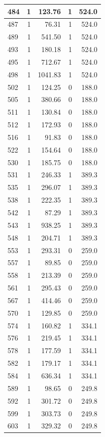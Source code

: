 \documentclass[
  12pt,
]{book}
\begin{document}
\begin{tabular}{l|r|r|r|r}
\hline
484 & 1 & 123.76 & 1 & 524.0\\
\hline
487 & 1 & 76.31 & 1 & 524.0\\
\hline
489 & 1 & 541.50 & 1 & 524.0\\
\hline
493 & 1 & 180.18 & 1 & 524.0\\
\hline
495 & 1 & 712.67 & 1 & 524.0\\
\hline
498 & 1 & 1041.83 & 1 & 524.0\\
\hline
502 & 1 & 124.25 & 0 & 188.0\\
\hline
505 & 1 & 380.66 & 0 & 188.0\\
\hline
511 & 1 & 130.84 & 0 & 188.0\\
\hline
512 & 1 & 172.93 & 0 & 188.0\\
\hline
516 & 1 & 91.83 & 0 & 188.0\\
\hline
522 & 1 & 154.64 & 0 & 188.0\\
\hline
530 & 1 & 185.75 & 0 & 188.0\\
\hline
531 & 1 & 246.33 & 1 & 389.3\\
\hline
535 & 1 & 296.07 & 1 & 389.3\\
\hline
538 & 1 & 222.35 & 1 & 389.3\\
\hline
542 & 1 & 87.29 & 1 & 389.3\\
\hline
543 & 1 & 938.25 & 1 & 389.3\\
\hline
548 & 1 & 204.71 & 1 & 389.3\\
\hline
553 & 1 & 293.31 & 0 & 259.0\\
\hline
557 & 1 & 89.85 & 0 & 259.0\\
\hline
558 & 1 & 213.39 & 0 & 259.0\\
\hline
561 & 1 & 295.43 & 0 & 259.0\\
\hline
567 & 1 & 414.46 & 0 & 259.0\\
\hline
570 & 1 & 129.85 & 0 & 259.0\\
\hline
574 & 1 & 160.82 & 1 & 334.1\\
\hline
576 & 1 & 219.45 & 1 & 334.1\\
\hline
578 & 1 & 177.59 & 1 & 334.1\\
\hline
582 & 1 & 179.17 & 1 & 334.1\\
\hline
584 & 1 & 636.34 & 1 & 334.1\\
\hline
589 & 1 & 98.65 & 0 & 249.8\\
\hline
592 & 1 & 301.72 & 0 & 249.8\\
\hline
599 & 1 & 303.73 & 0 & 249.8\\
\hline
603 & 1 & 329.32 & 0 & 249.8\\

\end{tabular}
\end{document}

